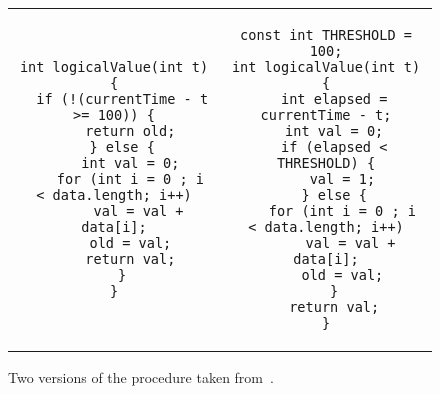 \begin{figure*}
\centering
\begin{tabular}{cc}
\begin{lstlisting}
int logicalValue(int t) {
  if (!(currentTime - t >= 100)) {
    return old;
  } else {
    int val = 0;
    for (int i = 0 ; i < data.length; i++)
      val = val + data[i];
    old = val;
    return val;
  }
}
\end{lstlisting}
&
\begin{lstlisting}
const int THRESHOLD = 100;
int logicalValue(int t) {
  int elapsed = currentTime - t;
  int val = 0;
  if (elapsed < THRESHOLD) {
    val = 1;
  } else {
    for (int i = 0 ; i < data.length; i++)
      val = val + data[i];
    old = val;
  }
  return val;
}
\end{lstlisting}
\end{tabular}
\caption{Two versions of the  procedure taken from~\cite{DwyerElbaumPerson08}.}
\end{figure*} 